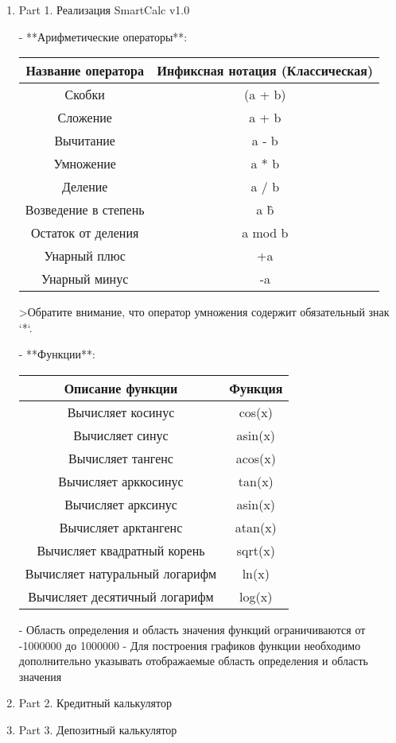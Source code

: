 \documentclass[12pt, letterpaper, twoside]{article}
\begin{document}
\begin{enumerate}
    \item Part 1. Реализация SmartCalc v1.0

    - **Арифметические операторы**:

    \begin{center}
      \begin{tabular}{ | c | c | }
        \hline
        Название оператора & Инфиксная нотация (Классическая) \\ 
        \hline\hline
        Скобки & (a + b) \\
        \hline
        Сложение & a + b \\
        \hline
        Вычитание & a - b \\
        \hline
        Умножение & a * b \\
        \hline
        Деление & a / b \\
        \hline
        Возведение в степень & a \^   b \\
        \hline
        Остаток от деления & a mod b \\
        \hline
        Унарный плюс & +a \\
        \hline
        Унарный минус & -a \\
        \hline
      \end{tabular}
    \end{center}

    >Обратите внимание, что оператор умножения содержит обязательный знак `*`. 

- **Функции**:

\begin{center}
  \begin{tabular}{ | c | c | }
    \hline
    Описание функции & Функция \\ 
    \hline\hline
    Вычисляет косинус & cos(x) \\
    \hline
    Вычисляет синус & asin(x) \\
    \hline
    Вычисляет тангенс & acos(x) \\
    \hline
    Вычисляет арккосинус & tan(x) \\
    \hline
    Вычисляет арксинус & asin(x) \\
    \hline
    Вычисляет арктангенс & atan(x) \\
    \hline
    Вычисляет квадратный корень & sqrt(x) \\
    \hline
    Вычисляет натуральный логарифм & ln(x) \\
    \hline
    Вычисляет десятичный логарифм & log(x) \\
    \hline
  \end{tabular}
\end{center}

- Область определения и область значения функций ограничиваются от -1000000 до 1000000
- Для построения графиков функции необходимо дополнительно указывать отображаемые область определения и область значения

    \item Part 2. Кредитный калькулятор
    \item Part 3. Депозитный калькулятор
  \end{enumerate}
\end{document}
